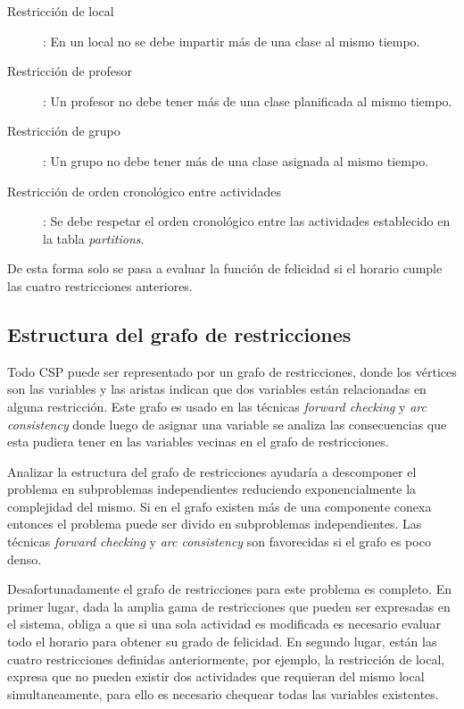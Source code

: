 \begin{description}

\item[Restricci\'on de local]: En un local no se debe impartir m\'as de una clase al mismo tiempo.
\item[Restricci\'on de profesor]: Un profesor no debe tener m\'as de una clase planificada al mismo tiempo.
\item[Restricci\'on de grupo]: Un grupo no debe tener m\'as de una clase asignada al mismo tiempo.
\item[Restricci\'on de orden cronol\'ogico entre actividades]: Se debe respetar el orden cronol\'ogico entre las actividades establecido en la tabla \emph{partitions}.

\end{description}

De esta forma solo se pasa a evaluar la funci\'on de felicidad si el horario cumple las cuatro restricciones anteriores.

\subsection{Estructura del grafo de restricciones}

Todo CSP puede ser representado por un grafo de restricciones, donde los v\'ertices son las variables y las aristas indican que dos variables est\'an relacionadas en alguna restricci\'on. Este grafo es usado en las t\'ecnicas \emph{forward checking} y \emph{arc consistency} donde luego de asignar una variable se analiza las consecuencias que esta pudiera tener en las variables vecinas en el grafo de restricciones.

Analizar la estructura del grafo de restricciones ayudar\'ia a descomponer el problema en subproblemas independientes reduciendo exponencialmente la complejidad del mismo. Si en el grafo existen m\'as de una componente conexa entonces el problema puede ser divido en subproblemas independientes. Las t\'ecnicas \emph{forward checking} y \emph{arc consistency} son favorecidas si el grafo es poco denso.

Desafortunadamente el grafo de restricciones para este problema es completo. En primer lugar, dada la amplia gama de restricciones que pueden ser expresadas en el sistema, obliga a que si una sola actividad es modificada es necesario evaluar todo el horario para obtener su grado de felicidad. En segundo lugar, est\'an las cuatro restricciones definidas anteriormente, por ejemplo, la restricci\'on de local, expresa que no pueden existir dos actividades que requieran del mismo local simultaneamente, para ello es necesario chequear todas las variables existentes. 

